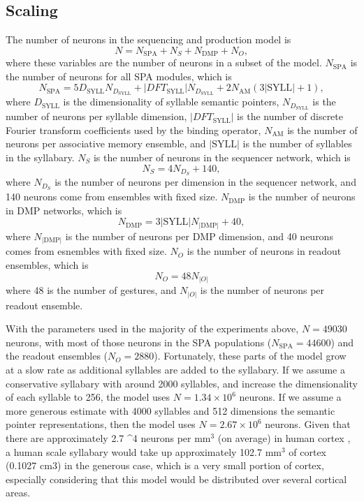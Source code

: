 \subsection{Scaling}
\label{sec:res-prod-scaling}

The number of neurons in the
sequencing and production model is
\begin{equation}
  N = N_{\text{SPA}} + N_S + N_{\text{DMP}} + N_O,
\end{equation}
where these variables
are the number of neurons in
a subset of the model.
$N_{\text{SPA}}$ is the number of
neurons for all SPA modules,
which is
\begin{equation}
  N_{\text{SPA}} = 5 D_{\text{SYLL}} N_D_{\text{SYLL}} +
      |DFT_{\text{SYLL}}| N_D_{\text{SYLL}}
      + 2 N_{\text{AM}} (3 |\text{SYLL}| + 1),
\end{equation}
where $D_{\text{SYLL}}$ is the dimensionality
of syllable semantic pointers,
$N_D_{\text{SYLL}}$ is the number of neurons
per syllable dimension,
$|DFT_{\text{SYLL}}|$ is the number of
discrete Fourier transform coefficients
used by the binding operator,
$N_{\text{AM}}$ is the number of neurons
per associative memory ensemble,
and $|\text{SYLL}|$ is the number of
syllables in the syllabary.
$N_S$ is the number of neurons
in the sequencer network,
which is
\begin{equation}
  N_S = 4 N_D_S + 140,
\end{equation}
where $N_D_S$ is the number of neurons
per dimension in the sequencer network,
and 140 neurons come from ensembles
with fixed size.
$N_{\text{DMP}}$ is the number of neurons
in DMP networks, which is
\begin{equation}
  N_{\text{DMP}} = 3 |\text{SYLL}| N_{|\text{DMP}|} + 40,
\end{equation}
where $N_{|\text{DMP}|}$ is the number of neurons
per DMP dimension,
and 40 neurons comes from esnembles with fixed size.
$N_O$ is the number of neurons
in readout ensembles, which is
\begin{equation}
  N_O = 48 N_{|O|}
\end{equation}
where 48 is the number of gestures,
and $N_{|O|}$ is the number of neurons
per readout ensemble.

With the parameters used
in the majority of the experiments above,
$N=49030$ neurons,
with most of those neurons
in the SPA populations
($N_{\text{SPA}}=44600$)
and the readout ensembles ($N_O=2880$).
Fortunately, these parts of the model
grow at a slow rate
as additional syllables are added
to the syllabary.
If we assume a conservative syllabary
with around 2000 syllables,
and increase the dimensionality
of each syllable to 256,
the model uses
$N=1.34 \times 10^6$ neurons.
If we assume a more generous estimate
with 4000 syllables
and 512 dimensions
the semantic pointer representations,
then the model uses
$N=2.67 \times 10^6$ neurons.
Given that there are approximately
2.7 ^4 neurons per mm$^3$ (on average)
in human cortex \citep[BNID 112050]{milo2010},
a human scale syllabary would take up
approximately 102.7 mm$^3$ of cortex
(0.1027 cm$3$)
in the generous case,
which is a very small portion of cortex,
especially considering that this model
would be distributed over
several cortical areas.


